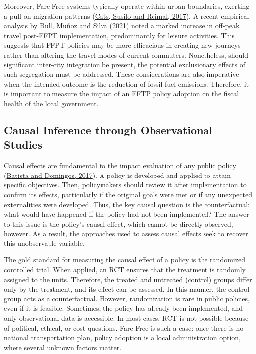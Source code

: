 \documentclass[12pt, a4paper, twoside]{article}
\numberwithin{equation}{subsection} %
\begin{document}
Moreover, Fare-Free systems typically operate within urban boundaries,
exerting a pull on migration patterns
(\protect\hyperlink{ref-cats_prospects_2017}{Cats, Susilo and Reimal,
2017}). A recent empirical analysis by Bull, Muñoz and Silva
(\protect\hyperlink{ref-BULL-RCT-2021}{2021}) noted a marked increase in
off-peak travel post-FFPT implementation, predominantly for leisure
activities. This suggests that FFPT policies may be more efficacious in
creating new journeys rather than altering the travel modes of current
commuters. Nonetheless, should significant inter-city integration be
present, the potential exclusionary effects of such segregation must be
addressed. These considerations are also imperative when the intended
outcome is the reduction of fossil fuel emissions. Therefore, it is
important to measure the impact of an FFTP policy adoption on the fiscal
health of the local government.

\hypertarget{causal-inference-through-observational-studies}{%
\subsection{Causal Inference through Observational
Studies}\label{causal-inference-through-observational-studies}}

Causal effects are fundamental to the impact evaluation of any public
policy (\protect\hyperlink{ref-batista_domingos_2017}{Batista and
Domingos, 2017}). A policy is developed and applied to attain specific
objectives. Then, policymakers should review it after implementation to
confirm its effects, particularly if the original goals were met or if
any unexpected externalities were developed. Thus, the key causal
question is the counterfactual: what would have happened if the policy
had not been implemented? The answer to this issue is the policy's
causal effect, which cannot be directly observed, however. As a result,
the approaches used to assess causal effects seek to recover this
unobservable variable.

The gold standard for measuring the causal effect of a policy is the
randomized controlled trial. When applied, an RCT ensures that the
treatment is randomly assigned to the units. Therefore, the treated and
untreated (control) groups differ only by the treatment, and its effect
can be assessed. In this manner, the control group acts as a
counterfactual. However, randomization is rare in public policies, even
if it is feasible. Sometimes, the policy has already been implemented,
and only observational data is accessible. In most cases, RCT is not
possible because of political, ethical, or cost questions. Fare-Free is
such a case: once there is no national transportation plan, policy
adoption is a local administration option, where several unknown factors
matter.
\end{document}
